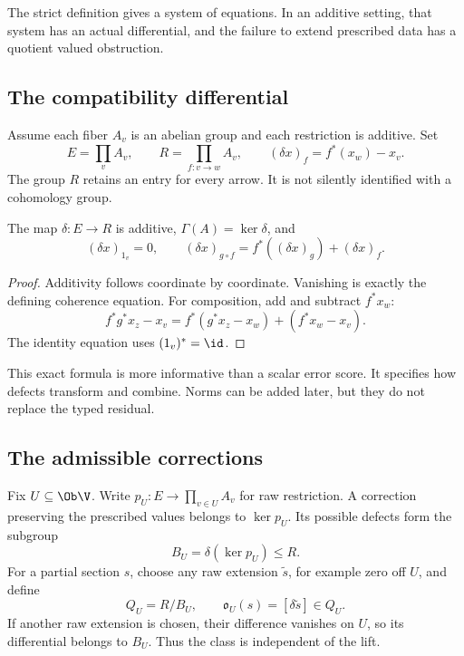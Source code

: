 \label{sec:obstruction}
The strict definition gives a system of equations. In an additive setting, that system has an actual differential, and the failure to extend prescribed data has a quotient valued obstruction.

\subsection{The compatibility differential}
Assume each fiber \(A_v\) is an abelian group and each restriction is additive. Set
\[
 E=\prod_v A_v,\qquad R=\prod_{f:v\to w}A_v,
 \qquad (\delta x)_f=f^*(x_w)-x_v.
\]
The group \(R\) retains an entry for every arrow. It is not silently identified with a cohomology group.

\begin{proposition}\label{KS08}
The map \(\delta:E\to R\) is additive, \(\Gamma(A)=\ker\delta\), and
\[
 (\delta x)_{1_v}=0,\qquad
 (\delta x)_{g\circ f}=f^*((\delta x)_g)+(\delta x)_f.
\]
\end{proposition}
\begin{proof}
Additivity follows coordinate by coordinate. Vanishing is exactly the defining coherence equation. For composition, add and subtract \(f^*x_w\):
\[
 f^*g^*x_z-x_v
 =f^*(g^*x_z-x_w)+(f^*x_w-x_v).
\]
The identity equation uses \((1_v)^*=\id\).
\end{proof}
This exact formula is more informative than a scalar error score. It specifies how defects transform and combine. Norms can be added later, but they do not replace the typed residual.

\subsection{The admissible corrections}
Fix \(U\subseteq\Ob\V\). Write \(p_U:E\to\prod_{v\in U}A_v\) for raw restriction. A correction preserving the prescribed values belongs to \(\ker p_U\). Its possible defects form the subgroup
\[
 B_U=\delta(\ker p_U)\le R.
\]
For a partial section \(s\), choose any raw extension \(\widetilde s\), for example zero off \(U\), and define
\begin{equation}\label{eq:obstruction}
 Q_U=R/B_U,\qquad
 \mathfrak o_U(s)=[\delta\widetilde s]\in Q_U.
\end{equation}
If another raw extension is chosen, their difference vanishes on \(U\), so its differential belongs to \(B_U\). Thus the class is independent of the lift.

